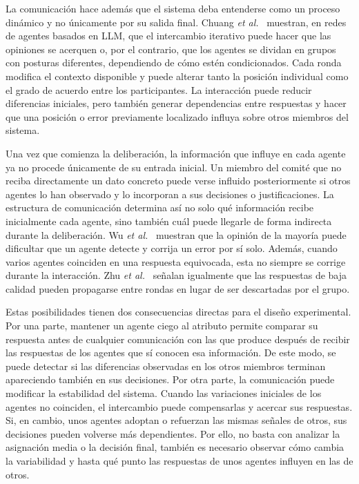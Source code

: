 La comunicación hace además que el sistema deba entenderse como un proceso dinámico y no únicamente por su salida final. Chuang \textit{et al.}~\cite{chuang2024simulating} muestran, en redes de agentes basados en LLM, que el intercambio iterativo puede hacer que las opiniones se acerquen o, por el contrario, que los agentes se dividan en grupos con posturas diferentes, dependiendo de cómo estén condicionados. Cada ronda modifica el contexto disponible y puede alterar tanto la posición individual como el grado de acuerdo entre los participantes. La interacción puede reducir diferencias iniciales, pero también generar dependencias entre respuestas y hacer que una posición o error previamente localizado influya sobre otros miembros del sistema.

Una vez que comienza la deliberación, la información que influye en cada agente ya no procede únicamente de su entrada inicial. Un miembro del comité que no reciba directamente un dato concreto puede verse influido posteriormente si otros agentes lo han observado y lo incorporan a sus decisiones o justificaciones. La estructura de comunicación determina así no solo qué información recibe inicialmente cada agente, sino también cuál puede llegarle de forma indirecta durante la deliberación. Wu \textit{et al.}~\cite{wu2025can} muestran que la opinión de la mayoría puede dificultar que un agente detecte y corrija un error por sí solo. Además, cuando varios agentes coinciden en una respuesta equivocada, esta no siempre se corrige durante la interacción. Zhu \textit{et al.}~\cite{zhu2026demystifying} señalan igualmente que las respuestas de baja calidad pueden propagarse entre rondas en lugar de ser descartadas por el grupo.

Estas posibilidades tienen dos consecuencias directas para el diseño experimental. Por una parte, mantener un agente ciego al atributo permite comparar su respuesta antes de cualquier comunicación con las que produce después de recibir las respuestas de los agentes que sí conocen esa información. De este modo, se puede detectar si las diferencias observadas en los otros miembros terminan apareciendo también en sus decisiones. Por otra parte, la comunicación puede modificar la estabilidad del sistema. Cuando las variaciones iniciales de los agentes no coinciden, el intercambio puede compensarlas y acercar sus respuestas. Si, en cambio, unos agentes adoptan o refuerzan las mismas señales de otros, sus decisiones pueden volverse más dependientes. Por ello, no basta con analizar la asignación media o la decisión final, también es necesario observar cómo cambia la variabilidad y hasta qué punto las respuestas de unos agentes influyen en las de otros.

